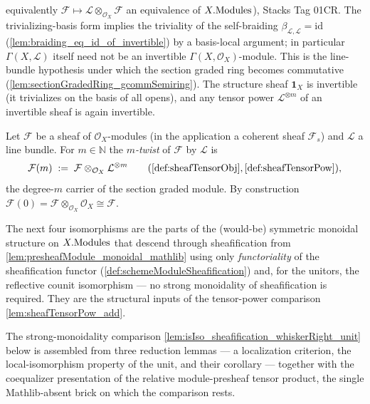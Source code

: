 \begin{definition}
  equivalently \(\mathcal{F} \mapsto \mathcal{L} \otimes_{\mathcal{O}_X}
  \mathcal{F}\) an equivalence of \(X.\mathrm{Modules}\)), Stacks Tag 01CR. The
  trivializing-basis form implies the triviality of the self-braiding
  \(\beta_{\mathcal{L},\mathcal{L}} = \mathrm{id}\)
  (\cref{lem:braiding_eq_id_of_invertible}) by a basis-local argument; in
  particular \(\Gamma(X,\mathcal{L})\) itself need not be an invertible
  \(\Gamma(X,\mathcal{O}_X)\)-module. This is the line-bundle hypothesis under which
  the section graded ring becomes commutative
  (\cref{lem:sectionGradedRing_gcommSemiring}). The structure sheaf \(\mathbf{1}_X\)
  is invertible (it trivializes on the basis of all opens), and any tensor power
  \(\mathcal{L}^{\otimes m}\) of an invertible sheaf is again invertible.
\end{definition}


\begin{definition}
  \label{def:sheafModuleTwist}
  Let \(\mathcal{F}\) be a sheaf of \(\mathcal{O}_X\)-modules (in the application
  a coherent sheaf \(\mathcal{F}_s\)) and \(\mathcal{L}\) a line bundle. For
  \(m \in \mathbb{N}\) the \emph{\(m\)-twist} of \(\mathcal{F}\) by
  \(\mathcal{L}\) is
  \[
    \mathcal{F}(m) \;:=\;
      \mathcal{F} \otimes_{\mathcal{O}_X} \mathcal{L}^{\otimes m}
      \qquad(\cref{def:sheafTensorObj}, \cref{def:sheafTensorPow}),
  \]
  the degree-\(m\) carrier of the section graded module. By construction
  \(\mathcal{F}(0) = \mathcal{F} \otimes_{\mathcal{O}_X} \mathcal{O}_X \cong
  \mathcal{F}\).
\end{definition}


The next four isomorphisms are the parts of the (would-be) symmetric monoidal
structure on \(X.\mathrm{Modules}\) that descend through sheafification from
\cref{lem:presheafModule_monoidal_mathlib} using only \emph{functoriality} of the
sheafification functor (\cref{def:schemeModuleSheafification}) and, for the
unitors, the reflective counit isomorphism --- no strong monoidality of
sheafification is required. They are the structural inputs of the tensor-power
comparison \cref{lem:sheafTensorPow_add}.


The strong-monoidality comparison \cref{lem:isIso_sheafification_whiskerRight_unit}
below is assembled from three reduction lemmas --- a localization criterion, the
local-isomorphism property of the unit, and their corollary --- together with the
coequalizer presentation of the relative module-presheaf tensor product, the single
Mathlib-absent brick on which the comparison rests.


